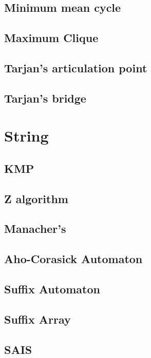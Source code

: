 \documentclass[a4paper,10pt,twocolumn,oneside]{article}
\begin{document}
\subsection{Minimum mean cycle}

\subsection{Maximum Clique}

\subsection{Tarjan's articulation point}

\subsection{Tarjan's bridge}

\section{String}
\subsection{KMP}

\subsection{Z algorithm}

\subsection{Manacher's}

\subsection{Aho-Corasick Automaton}

\subsection{Suffix Automaton}

\subsection{Suffix Array}

\subsection{SAIS}

\end{document}
